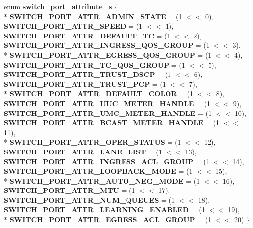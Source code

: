 \begin{DoxyCompactItemize}
\item 
\hypertarget{group__Port_ga50cd49cb171ae0bdbfe15178fecdc692}{enum {\bfseries switch\+\_\+port\+\_\+attribute\+\_\+s} \{ \\*
{\bfseries S\+W\+I\+T\+C\+H\+\_\+\+P\+O\+R\+T\+\_\+\+A\+T\+T\+R\+\_\+\+A\+D\+M\+I\+N\+\_\+\+S\+T\+A\+T\+E} = (1 $<$$<$ 0), 
{\bfseries S\+W\+I\+T\+C\+H\+\_\+\+P\+O\+R\+T\+\_\+\+A\+T\+T\+R\+\_\+\+S\+P\+E\+E\+D} = (1 $<$$<$ 1), 
{\bfseries S\+W\+I\+T\+C\+H\+\_\+\+P\+O\+R\+T\+\_\+\+A\+T\+T\+R\+\_\+\+D\+E\+F\+A\+U\+L\+T\+\_\+\+T\+C} = (1 $<$$<$ 2), 
{\bfseries S\+W\+I\+T\+C\+H\+\_\+\+P\+O\+R\+T\+\_\+\+A\+T\+T\+R\+\_\+\+I\+N\+G\+R\+E\+S\+S\+\_\+\+Q\+O\+S\+\_\+\+G\+R\+O\+U\+P} = (1 $<$$<$ 3), 
\\*
{\bfseries S\+W\+I\+T\+C\+H\+\_\+\+P\+O\+R\+T\+\_\+\+A\+T\+T\+R\+\_\+\+E\+G\+R\+E\+S\+S\+\_\+\+Q\+O\+S\+\_\+\+G\+R\+O\+U\+P} = (1 $<$$<$ 4), 
{\bfseries S\+W\+I\+T\+C\+H\+\_\+\+P\+O\+R\+T\+\_\+\+A\+T\+T\+R\+\_\+\+T\+C\+\_\+\+Q\+O\+S\+\_\+\+G\+R\+O\+U\+P} = (1 $<$$<$ 5), 
{\bfseries S\+W\+I\+T\+C\+H\+\_\+\+P\+O\+R\+T\+\_\+\+A\+T\+T\+R\+\_\+\+T\+R\+U\+S\+T\+\_\+\+D\+S\+C\+P} = (1 $<$$<$ 6), 
{\bfseries S\+W\+I\+T\+C\+H\+\_\+\+P\+O\+R\+T\+\_\+\+A\+T\+T\+R\+\_\+\+T\+R\+U\+S\+T\+\_\+\+P\+C\+P} = (1 $<$$<$ 7), 
\\*
{\bfseries S\+W\+I\+T\+C\+H\+\_\+\+P\+O\+R\+T\+\_\+\+A\+T\+T\+R\+\_\+\+D\+E\+F\+A\+U\+L\+T\+\_\+\+C\+O\+L\+O\+R} = (1 $<$$<$ 8), 
{\bfseries S\+W\+I\+T\+C\+H\+\_\+\+P\+O\+R\+T\+\_\+\+A\+T\+T\+R\+\_\+\+U\+U\+C\+\_\+\+M\+E\+T\+E\+R\+\_\+\+H\+A\+N\+D\+L\+E} = (1 $<$$<$ 9), 
{\bfseries S\+W\+I\+T\+C\+H\+\_\+\+P\+O\+R\+T\+\_\+\+A\+T\+T\+R\+\_\+\+U\+M\+C\+\_\+\+M\+E\+T\+E\+R\+\_\+\+H\+A\+N\+D\+L\+E} = (1 $<$$<$ 10), 
{\bfseries S\+W\+I\+T\+C\+H\+\_\+\+P\+O\+R\+T\+\_\+\+A\+T\+T\+R\+\_\+\+B\+C\+A\+S\+T\+\_\+\+M\+E\+T\+E\+R\+\_\+\+H\+A\+N\+D\+L\+E} = (1 $<$$<$ 11), 
\\*
{\bfseries S\+W\+I\+T\+C\+H\+\_\+\+P\+O\+R\+T\+\_\+\+A\+T\+T\+R\+\_\+\+O\+P\+E\+R\+\_\+\+S\+T\+A\+T\+U\+S} = (1 $<$$<$ 12), 
{\bfseries S\+W\+I\+T\+C\+H\+\_\+\+P\+O\+R\+T\+\_\+\+A\+T\+T\+R\+\_\+\+L\+A\+N\+E\+\_\+\+L\+I\+S\+T} = (1 $<$$<$ 13), 
{\bfseries S\+W\+I\+T\+C\+H\+\_\+\+P\+O\+R\+T\+\_\+\+A\+T\+T\+R\+\_\+\+I\+N\+G\+R\+E\+S\+S\+\_\+\+A\+C\+L\+\_\+\+G\+R\+O\+U\+P} = (1 $<$$<$ 14), 
{\bfseries S\+W\+I\+T\+C\+H\+\_\+\+P\+O\+R\+T\+\_\+\+A\+T\+T\+R\+\_\+\+L\+O\+O\+P\+B\+A\+C\+K\+\_\+\+M\+O\+D\+E} = (1 $<$$<$ 15), 
\\*
{\bfseries S\+W\+I\+T\+C\+H\+\_\+\+P\+O\+R\+T\+\_\+\+A\+T\+T\+R\+\_\+\+A\+U\+T\+O\+\_\+\+N\+E\+G\+\_\+\+M\+O\+D\+E} = (1 $<$$<$ 16), 
{\bfseries S\+W\+I\+T\+C\+H\+\_\+\+P\+O\+R\+T\+\_\+\+A\+T\+T\+R\+\_\+\+M\+T\+U} = (1 $<$$<$ 17), 
{\bfseries S\+W\+I\+T\+C\+H\+\_\+\+P\+O\+R\+T\+\_\+\+A\+T\+T\+R\+\_\+\+N\+U\+M\+\_\+\+Q\+U\+E\+U\+E\+S} = (1 $<$$<$ 18), 
{\bfseries S\+W\+I\+T\+C\+H\+\_\+\+P\+O\+R\+T\+\_\+\+A\+T\+T\+R\+\_\+\+L\+E\+A\+R\+N\+I\+N\+G\+\_\+\+E\+N\+A\+B\+L\+E\+D} = (1 $<$$<$ 19), 
\\*
{\bfseries S\+W\+I\+T\+C\+H\+\_\+\+P\+O\+R\+T\+\_\+\+A\+T\+T\+R\+\_\+\+E\+G\+R\+E\+S\+S\+\_\+\+A\+C\+L\+\_\+\+G\+R\+O\+U\+P} = (1 $<$$<$ 20)
 \}}\label{group__Port_ga50cd49cb171ae0bdbfe15178fecdc692}


\end{DoxyCompactItemize}
